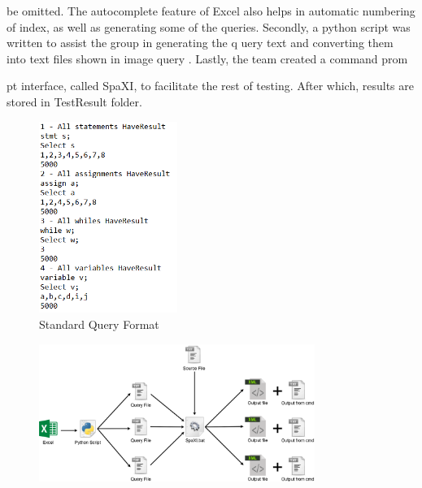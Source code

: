 \documentclass[12pt]{article}
\begin{document}
{{{{{{{{{{{{{be omitted. The autocomplete feature of Excel also helps in automatic numbering of index, as well as generating some of the queries. Secondly, a python script was written to assist the group in generating the q
uery text and converting them into text files shown in image query . Lastly, the team created a command prom

pt interface, called SpaXI, to facilitate the rest of testing. After which, results are stored in TestResult folder.

    \hspace{6mm}
    \begin{center}
      \begin{figure}[H]
\includegraphics[width = 0.4\textwidth]{format.png}
\caption{Standard Query Format}
  \end{figure}
  \begin{figure}[H]
\includegraphics[width = 0.8\textwidth]{Flow.png}
  \end{figure}
    \end{center}
}}}}}}}}}}}}}
\end{document}
